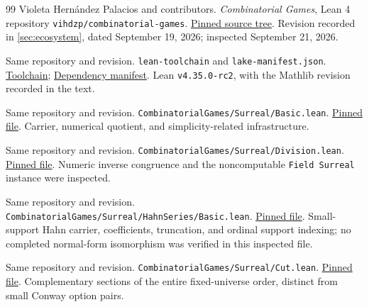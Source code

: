 \documentclass[11pt,letterpaper]{article}
\numberwithin{equation}{section}
\theoremstyle{definition}
\theoremstyle{remark}
\begin{document}
\begin{thebibliography}{99}
Violeta Hern\'andez Palacios and contributors. \emph{Combinatorial Games}, Lean 4 repository \texttt{vihdzp/combinatorial-games}.
\href{https://github.com/vihdzp/combinatorial-games/tree/02b4a908ea2ecfefffecb438f691951a814a5264}{Pinned source tree}. Revision recorded in \cref{sec:ecosystem}, dated September 19, 2026; inspected September 21, 2026.

Same repository and revision. \texttt{lean-toolchain} and \texttt{lake-manifest.json}.
\href{https://github.com/vihdzp/combinatorial-games/blob/02b4a908ea2ecfefffecb438f691951a814a5264/lean-toolchain}{Toolchain};
\href{https://github.com/vihdzp/combinatorial-games/blob/02b4a908ea2ecfefffecb438f691951a814a5264/lake-manifest.json}{Dependency manifest}. Lean \texttt{v4.35.0-rc2}, with the Mathlib revision recorded in the text.

Same repository and revision. \texttt{CombinatorialGames/Surreal/Basic.lean}.
\href{https://github.com/vihdzp/combinatorial-games/blob/02b4a908ea2ecfefffecb438f691951a814a5264/CombinatorialGames/Surreal/Basic.lean}{Pinned file}. Carrier, numerical quotient, and simplicity-related infrastructure.

Same repository and revision. \texttt{CombinatorialGames/Surreal/Division.lean}.
\href{https://github.com/vihdzp/combinatorial-games/blob/02b4a908ea2ecfefffecb438f691951a814a5264/CombinatorialGames/Surreal/Division.lean}{Pinned file}. Numeric inverse congruence and the noncomputable \texttt{Field Surreal} instance were inspected.

Same repository and revision. \texttt{CombinatorialGames/Surreal/HahnSeries/Basic.lean}.
\href{https://github.com/vihdzp/combinatorial-games/blob/02b4a908ea2ecfefffecb438f691951a814a5264/CombinatorialGames/Surreal/HahnSeries/Basic.lean}{Pinned file}. Small-support Hahn carrier, coefficients, truncation, and ordinal support indexing; no completed normal-form isomorphism was verified in this inspected file.

Same repository and revision. \texttt{CombinatorialGames/Surreal/Cut.lean}.
\href{https://github.com/vihdzp/combinatorial-games/blob/02b4a908ea2ecfefffecb438f691951a814a5264/CombinatorialGames/Surreal/Cut.lean}{Pinned file}. Complementary sections of the entire fixed-universe order, distinct from small Conway option pairs.

\end{thebibliography}
\end{document}

